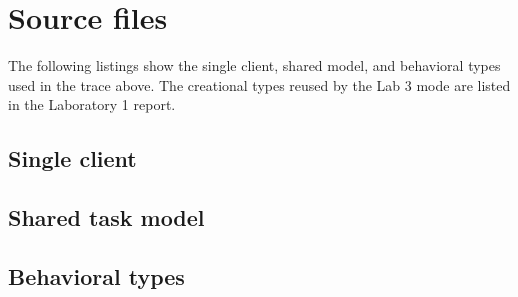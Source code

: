 \documentclass{utmreport}
\begin{document}
\appendix
\chapter{Source files}\label{app:source}
The following listings show the single client, shared model, and behavioral types used in the trace above. The creational types reused by the Lab 3 mode are listed in the Laboratory 1 report.
\section{Single client}

\section{Shared task model}

\section{Behavioral types}

\end{document}
